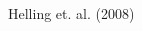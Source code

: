 \message{ !name(May13.tex)}\documentclass[14pt]{beamer}
\newcommand*\figcite[1]{\vspace*{\fill}\raggedleft\footnotesize{#1}}
\begin{document}
\begin{frame}
\begin{columnsonlytextwidth}
\begin{column}{0.6\textwidth}
    \end{column}
  \end{columnsonlytextwidth}
  \figcite{Helling et. al. (2008)}
\end{frame}
\end{document}
